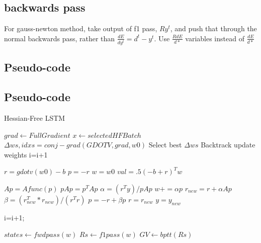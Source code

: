 \documentclass{article}
\begin{document}

\subsection{backwards pass}
For gauss-newton method, take output of f1 pass, $Ry^t$, and push that through the normal backwards pass, rather than $\frac{dE}{dy^t} = d^t - y^t$. Use $\frac{RdE}{d*}$ variables instead of $\frac{dE}{d*}$ 

\subsection{Pseudo-code}

\subsection{Pseudo-code}

\begin{algorithm}
\caption{Hessian-Free LSTM}
\begin{algorithmic}[0]
\State $grad\gets Full Gradient$
\State $x \gets selected HF Batch$
\State $\Delta ws, idxs=conj-grad(GDOTV, grad, w0)$
\State Select best $\Delta ws$
\State Backtrack 
\State update weights
\State i=i+1
\EndWhile
\EndProcedure 


\State $r=gdotv(w0)-b$
\State $p=-r$
\State $w=w0$
\State $val=.5(-b+r)^Tw$

\State $Ap=Afunc(p)$
\State $pAp = p^TAp$ 
\State $\alpha = (r^Ty)/pAp$
\State $w+=\alpha p$
\State $r_{new} = r + \alpha Ap$
\State $\beta = (r_{new}^T*r_{new})/(r^Tr)$
\State $p = -r + \beta p$
\State $r = r_{new}$
\State $y = y_{new}$

\State i=i+1;
\EndWhile
\EndProcedure


\State $states\gets fwdpass(w)$
\State $Rs \gets f1pass(w)$
\State $GV \gets bptt(Rs)$
\EndProcedure


\end{algorithmic}
\end{algorithm}
\end{document}
